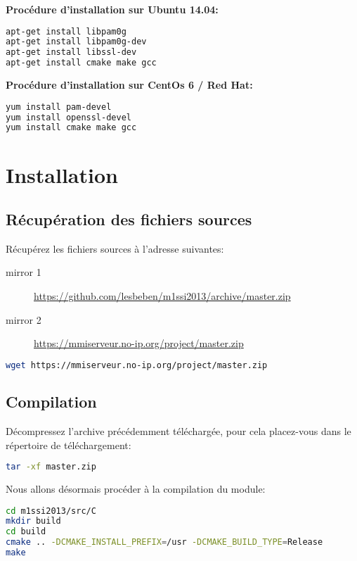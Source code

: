 \documentclass{"../../../res/univ-projet"}
\begin{document}
\textbf{Procédure d'installation sur Ubuntu 14.04:}\\
\begin{lstlisting}[language=bash, backgroundcolor=\color{black}, basicstyle=\color{white}]
apt-get install libpam0g
apt-get install libpam0g-dev
apt-get install libssl-dev
apt-get install cmake make gcc
\end{lstlisting}

\textbf{Procédure d'installation sur CentOs 6 / Red Hat:}\\
\begin{lstlisting}[language=bash, backgroundcolor=\color{black}, basicstyle=\color{white}]
yum install pam-devel
yum install openssl-devel
yum install cmake make gcc
\end{lstlisting}

\newpage

\section{Installation}
\subsection{Récupération des fichiers sources}
Récupérez les fichiers sources à l'adresse suivantes:
\begin{description}
\item[mirror 1] \href{https://github.com/lesbeben/m1ssi2013/archive/master.zip}{https://github.com/lesbeben/m1ssi2013/archive/master.zip}\\

\item[mirror 2] \href{https://mmiserveur.no-ip.org/project/master.zip}{https://mmiserveur.no-ip.org/project/master.zip}\\
\end{description}

\begin{lstlisting}[language=bash, backgroundcolor=\color{black}, basicstyle=\color{white}]
wget https://mmiserveur.no-ip.org/project/master.zip
\end{lstlisting}

\subsection{Compilation}
Décompressez l'archive précédemment téléchargée, pour cela placez-vous 
dans le répertoire de téléchargement:
\begin{lstlisting}[language=bash, backgroundcolor=\color{black}, basicstyle=\color{white}]
tar -xf master.zip
\end{lstlisting}
Nous allons désormais procéder à la compilation du module:
\begin{lstlisting}[language=bash, backgroundcolor=\color{black}, basicstyle=\color{white}]
cd m1ssi2013/src/C
mkdir build
cd build
cmake .. -DCMAKE_INSTALL_PREFIX=/usr -DCMAKE_BUILD_TYPE=Release 
make
\end{lstlisting}
\end{document}
